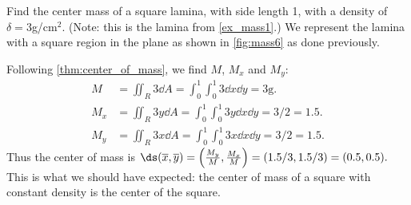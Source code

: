 \begin{example}\label{ex_mass6}
Find the center mass of a square lamina, with side length 1, with a density of $\delta = 3$g/cm$^2$. (Note: this is the lamina from \autoref{ex_mass1}.)
\solution
We represent the lamina with a square region in the plane as shown in \autoref{fig:mass6} as done previously. 

Following \autoref{thm:center_of_mass}, we find $M$, $M_x$ and $M_y$:
%
%
\begin{align*}
M &= \iint_R 3\dd A = \int_0^1\int_0^1 3\dd x\dd y =3\text{g}.\\
M_x &= \iint_R 3y\dd A = \int_0^1\int_0^1 3y\dd x\dd y =3/2 = 1.5.\\
M_y &= \iint_R 3x\dd A = \int_0^1\int_0^1 3x\dd x\dd y =3/2 = 1.5.
\end{align*}
Thus the center of mass is $\ds (\overline{x},\overline{y}) = \left(\frac{M_y}M,\frac{M_x}M\right) = (1.5/3,1.5/3) = (0.5,0.5).$ This is what we should have expected: the center of mass of a square with constant density is the center of the square.
\end{example}

